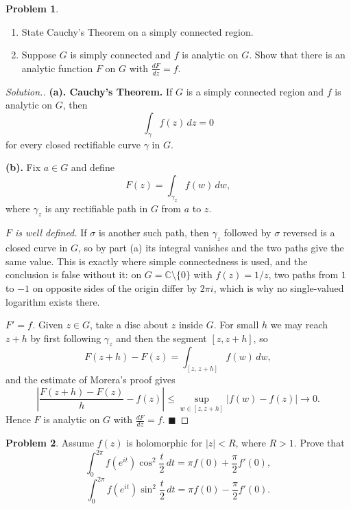 \documentclass[11pt,a4paper]{article}
\theoremstyle{definition}
\newtheorem{problemx}{Problem}[section]
\newenvironment{problem}{\begin{problemx}}{\end{problemx}}
\newenvironment{solution}
  {\renewcommand{\qedsymbol}{}\begin{proof}[\textit{Solution}.]}
  {\end{proof}}
\begin{document}
\begin{problem}
\begin{enumerate}
\item[(a).] State Cauchy's Theorem on a simply connected region.
\item[(b).] Suppose $G$ is simply connected and $f$ is analytic on $G$. Show that
there is an analytic function $F$ on $G$ with $\frac{dF}{dz} = f$.
\end{enumerate}
\end{problem}

\begin{solution}
\textbf{(a). Cauchy's Theorem.} If $G$ is a simply connected region and $f$ is
analytic on $G$, then
$$\int_{\gamma} f(z)\,dz = 0$$
for every closed rectifiable curve $\gamma$ in $G$.

\textbf{(b).} Fix $a \in G$ and define
$$F(z) = \int_{\gamma_z} f(w)\,dw,$$
where $\gamma_z$ is any rectifiable path in $G$ from $a$ to $z$.

\emph{$F$ is well defined.} If $\sigma$ is another such path, then
$\gamma_z$ followed by $\sigma$ reversed is a closed curve in $G$, so by part (a)
its integral vanishes and the two paths give the same value. This is exactly where
simple connectedness is used, and the conclusion is false without it: on
$G = \mathbb{C}\setminus\{0\}$ with $f(z) = 1/z$, two paths from $1$ to $-1$ on
opposite sides of the origin differ by $2\pi i$, which is why no single-valued
logarithm exists there.

\emph{$F' = f$.} Given $z \in G$, take a disc about $z$ inside $G$. For small $h$
we may reach $z+h$ by first following $\gamma_z$ and then the segment
$[z, z+h]$, so
$$F(z+h) - F(z) = \int_{[z,\,z+h]} f(w)\,dw,$$
and the estimate of Morera's proof gives
$$\left|\frac{F(z+h)-F(z)}{h} - f(z)\right|
\leq \sup_{w\in[z,z+h]}\left|f(w)-f(z)\right| \longrightarrow 0 .$$
Hence $F$ is analytic on $G$ with $\frac{dF}{dz} = f$. $\blacksquare$
\end{solution}


\begin{problem}
Assume $f(z)$ is holomorphic for $\left|z\right| < R$, where $R > 1$. Prove that
$$\int^{2\pi}_{0} f\!\left(e^{it}\right)\cos^{2}\frac{t}{2}\,dt
= \pi f(0) + \frac{\pi}{2}f'(0),$$
$$\int^{2\pi}_{0} f\!\left(e^{it}\right)\sin^{2}\frac{t}{2}\,dt
= \pi f(0) - \frac{\pi}{2}f'(0).$$
\end{problem}
\end{document}
